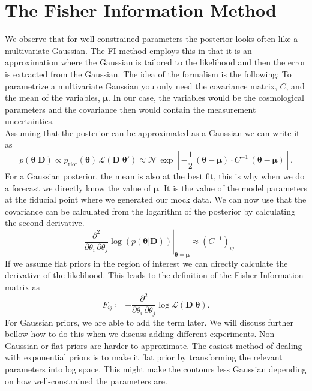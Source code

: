 \documentclass[../main.tex]{subfiles}
\begin{document}
\section{The Fisher Information Method}
We observe that for well-constrained parameters the posterior looks often like a multivariate Gaussian. The FI method employs this in that it is an approximation where the Gaussian is tailored to the likelihood and then the error is extracted from the Gaussian. The idea of the formalism is the following: To parametrize a multivariate Gaussian you only need the covariance matrix, $C$, and the mean of the variables, $\boldsymbol{\mu}$. In our case, the variables would be the cosmological parameters and the covariance then would contain the measurement uncertainties.\\
Assuming that the posterior can be approximated as a Gaussian we can write it as \begin{equation}
    p(\boldsymbol{\theta}|\boldsymbol{D}) \propto p_\mathrm{rior}(\boldsymbol{\theta})\,\mathcal{L}(\boldsymbol{D}|\boldsymbol{\theta}')\approx \mathcal{N}\,\exp\left[-\frac{1}{2}\,\left(\boldsymbol{\theta}-\boldsymbol{\mu}\right)\cdot C^{-1}\,\left(\boldsymbol{\theta}-\boldsymbol{\mu}\right)\right].
\end{equation}
For a Gaussian posterior, the mean is also at the best fit, this is why when we do a forecast we directly know the value of $\boldsymbol{\mu}$. It is the value of the model parameters at the fiducial point where we generated our mock data. We can now use that the covariance can be calculated from the logarithm of the posterior by calculating the second derivative. \begin{equation}
    \left.-\frac{\partial^2}{\partial \theta_i\,\partial \theta_j}\log(p(\boldsymbol{\theta}|\boldsymbol{D}))\right|_{\boldsymbol{\theta}=\boldsymbol{\mu}}\approx\left(C^{-1}\right)_{ij}
\end{equation}
If we assume flat priors in the region of interest we can directly calculate the derivative of the likelihood. This leads to the definition of the Fisher Information matrix as \begin{equation}
    F_{ij}\coloneqq -\frac{\partial^2}{\partial \theta_i\,\partial \theta_j}\log\mathcal{L}(\boldsymbol{D}|\boldsymbol{\theta}).
\end{equation}
For Gaussian priors, we are able to add the term later. We will discuss further bellow how to do this when we discuss adding different experiments. Non-Gaussian or flat priors are harder to approximate. The easiest method of dealing with exponential priors is to make it flat prior by transforming the relevant parameters into log space. This might make the contours less Gaussian depending on how well-constrained the parameters are.\\
\end{document}
